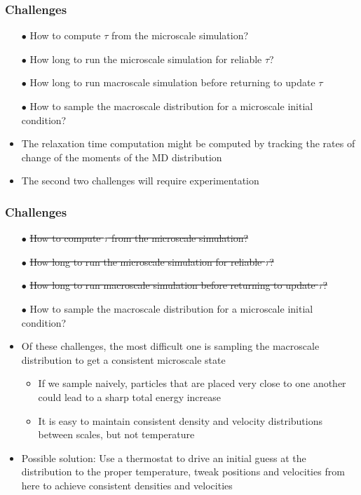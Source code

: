 \documentclass{beamer}
\begin{document}
\begin{frame}[t]
\frametitle{Challenges}
\tiny \begin{itemize}
\item[\tiny$\bullet$] How to compute $\tau$ from the microscale simulation?
\item[\tiny$\bullet$] How long to run the microscale simulation for reliable $\tau$?
\item[\tiny$\bullet$] How long to run macroscale simulation before returning to update $\tau$
\item[\tiny$\bullet$] How to sample the macroscale distribution for a microscale initial condition?
\end{itemize}\vspace{6em}
\normalsize
\begin{itemize}
\item The relaxation time computation might be computed by tracking the rates of change of the moments of the MD distribution
\vspace{1em}
\item The second two challenges will require experimentation
\end{itemize}
\end{frame}

\begin{frame}[t]
\frametitle{Challenges}
\tiny \begin{itemize}
\item[\tiny$\bullet$] \sout{How to compute $\tau$ from the microscale simulation?}
\item[\tiny$\bullet$] \sout{How long to run the microscale simulation for reliable $\tau$?}
\item[\tiny$\bullet$] \sout{How long to run macroscale simulation before returning to update $\tau$?}
\item[\tiny$\bullet$] How to sample the macroscale distribution for a microscale initial condition?
\end{itemize}\vspace{1em}
\normalsize
\begin{itemize}
\item Of these challenges, the most difficult one is sampling the macroscale distribution to get a consistent microscale state\vspace{0.5em}
\begin{itemize}
\item If we sample naively, particles that are placed very close to one another could lead to a sharp total energy increase\vspace{0.5em}
\item It is easy to maintain consistent density and velocity distributions between scales, but not temperature\vspace{0.5em}
\end{itemize}
\item Possible solution: Use a thermostat to drive an initial guess at the distribution to the proper temperature, tweak positions and velocities from here to achieve consistent densities and velocities
\end{itemize}
\end{frame}
\end{document}
